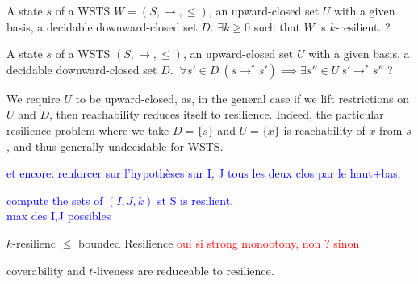 


{A state $s$ of a WSTS $W=(S,\rightarrow, \leq)$, an upward-closed set $U$ with a given basis, a decidable downward-closed set $D$.}
{$\exists k \geq 0$ such that $W$ is $k$-resilient. ?\newline}

{A state $s$ of a WSTS $(S,\rightarrow, \leq)$, an upward-closed set $U$ with a given basis, a decidable downward-closed set $D$.}
{$ ~ \forall s' \in D ~ (s \rightarrow^* s') \implies \exists s'' \in U ~ s' \rightarrow^{*} s''$ ?\newline}


\begin{remark} 
We require $U$ to be upward-closed, as, in the general case if we lift restrictions on $U$ and $D$, then reachability reduces itself to resilience. Indeed, the particular resilience problem where we take $D = \{s\}$ and $U = \{x\}$ is reachability of $x$ from $s$, and thus generally undecidable for WSTS. 
\end{remark}

\textcolor{blue}{
et encore: renforcer sur l'hypothèses sur I, J tous les deux clos par le haut+bas.
}

\textcolor{blue}{
compute the sets of $(I,J,k)$ st S is resilient.\\
max des I,J possibles \\
}



\begin{remark} 
$k$-resilienc $\leq$ bounded Resilience 
\textcolor{red}{oui si strong monootony, non ? sinon}
\end{remark}


\begin{proposition}\label{reductions}
coverability and $t$-liveness are reduceable to resilience.
\end{proposition}


